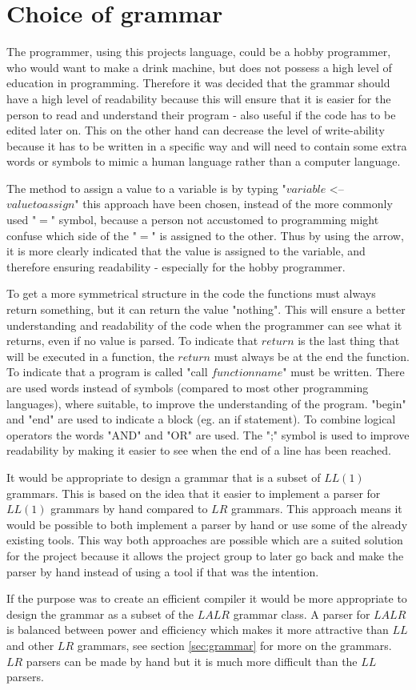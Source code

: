 \section{Choice of grammar}
The programmer, using this projects language, could be a hobby programmer, who would want to make a drink machine, but does not possess a high level of education in programming. Therefore it was decided that the grammar should have a high level of readability because this will ensure that it is easier for the person to read and understand their program - also useful if the code has to be edited later on. This on the other hand can decrease the level of write-ability because it has to be written in a specific way and will need to contain some extra words or symbols to mimic a human language rather than a computer language.


The method to assign a value to a variable is by typing "$variable$ <-- $value to assign$" this approach have been chosen, instead of the more commonly used "$=$" symbol, because a person not accustomed to programming might confuse which side of the "$=$" is assigned to the other. Thus by using the arrow, it is more clearly indicated that the value is assigned to the variable, and therefore ensuring readability - especially for the hobby programmer.

To get a more symmetrical structure in the code the functions must always return something, but it can return the value "nothing". This will ensure a better understanding and readability of the code when the programmer can see what it returns, even if no value is parsed. To indicate that $return$ is the last thing that will be executed in a function, the $return$ must always be at the end the function. To indicate that a program is called "call $functionname$" must be written.
There are used words instead of symbols (compared to most other programming languages), where suitable, to improve the understanding of the program.
"begin" and "end" are used to indicate a block (eg. an if statement). To combine logical operators the words "AND" and "OR" are used. The ";" symbol is used to improve readability by making it easier to see when the end of a line has been reached.

It would be appropriate to design a grammar that is a subset of $LL(1)$ grammars. This is based on the idea that it easier to implement a parser for $LL(1)$ grammars by hand compared to $LR$ grammars. This approach means it would be possible to both implement a parser by hand or use some of the already existing tools. This way both approaches are possible which are a suited solution for the project because it allows the project group to later go back and make the parser by hand instead of using a tool if that was the intention.

If the purpose was to create an efficient compiler it would be more appropriate to design the grammar as a subset of the $LALR$ grammar class. A parser for $LALR$ is balanced between power and efficiency which makes it more attractive than $LL$ and other $LR$ grammars, see section \ref{sec:grammar} for more on the grammars. $LR$ parsers can be made by hand but it is much more difficult than the $LL$ parsers.